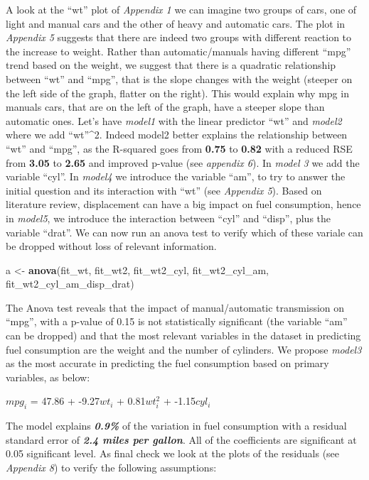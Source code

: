 \documentclass[]{article}
\newenvironment{Shaded}{\begin{snugshade}}{\end{snugshade}}
\newcommand{\KeywordTok}[1]{\textcolor[rgb]{0.13,0.29,0.53}{\textbf{{#1}}}}
\newcommand{\StringTok}[1]{\textcolor[rgb]{0.31,0.60,0.02}{{#1}}}
\newcommand{\NormalTok}[1]{{#1}}
\begin{document}
A look at the ``wt'' plot of \emph{Appendix 1} we can imagine two groups
of cars, one of light and manual cars and the other of heavy and
automatic cars. The plot in \emph{Appendix 5} suggests that there are
indeed two groups with different reaction to the increase to weight.
Rather than automatic/manuals having different ``mpg'' trend based on
the weight, we suggest that there is a quadratic relationship between
``wt'' and ``mpg'', that is the slope changes with the weight (steeper
on the left side of the graph, flatter on the right). This would explain
why mpg in manuals cars, that are on the left of the graph, have a
steeper slope than automatic ones. Let's have \emph{model1} with the
linear predictor ``wt'' and \emph{model2} where we add ``wt''\^{}2.
Indeed model2 better explains the relationship between ``wt'' and
``mpg'', as the R-squared goes from \textbf{0.75} to \textbf{0.82} with
a reduced RSE from \textbf{3.05} to \textbf{2.65} and improved p-value
(see \emph{appendix 6}). In \emph{model 3} we add the variable ``cyl''.
In \emph{model4} we introduce the variable ``am'', to try to answer the
initial question and its interaction with ``wt'' (see \emph{Appendix
5}). Based on literature review, displacement can have a big impact on
fuel consumption, hence in \emph{model5}, we introduce the interaction
between ``cyl'' and ``disp'', plus the variable ``drat''. We can now run
an anova test to verify which of these variale can be dropped without
loss of relevant information.

\begin{Shaded}
\begin{Highlighting}[]
\NormalTok{a <-}\StringTok{ }\KeywordTok{anova}\NormalTok{(fit_wt, fit_wt2, fit_wt2_cyl, fit_wt2_cyl_am, fit_wt2_cyl_am_disp_drat)}
\end{Highlighting}
\end{Shaded}

The Anova test reveals that the impact of manual/automatic transmission
on ``mpg'', with a p-value of 0.15 is not statistically significant (the
variable ``am'' can be dropped) and that the most relevant variables in
the dataset in predicting fuel consumption are the weight and the number
of cylinders. We propose \emph{model3} as the most accurate in
predicting the fuel consumption based on primary variables, as below:

\(mpg_i\) = 47.86 + -9.27\(wt_i\) + 0.81\(wt_i^2\) + -1.15\(cyl_i\)

The model explains \textbf{\emph{0.9\%}} of the variation in fuel
consumption with a residual standard error of \textbf{\emph{2.4 miles
per gallon}}. All of the coefficients are significant at 0.05
significant level. As final check we look at the plots of the residuals
(see \emph{Appendix 8}) to verify the following assumptions:
\end{document}
